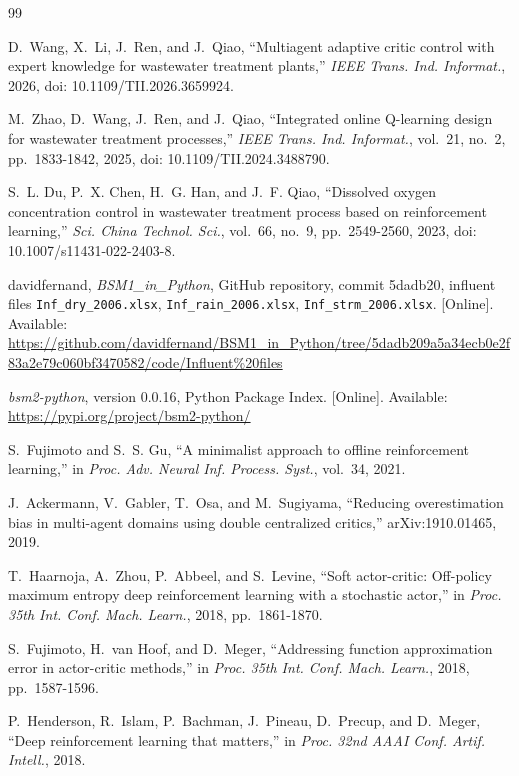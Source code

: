 \documentclass[journal]{IEEEtran}
\begin{document}
\begin{thebibliography}{99}

D.~Wang, X.~Li, J.~Ren, and J.~Qiao, ``Multiagent adaptive critic control with
expert knowledge for wastewater treatment plants,'' \emph{IEEE Trans. Ind.
Informat.}, 2026, doi: 10.1109/TII.2026.3659924.

M.~Zhao, D.~Wang, J.~Ren, and J.~Qiao, ``Integrated online Q-learning design
for wastewater treatment processes,'' \emph{IEEE Trans. Ind. Informat.},
vol.~21, no.~2, pp.~1833-1842, 2025, doi: 10.1109/TII.2024.3488790.

S.~L. Du, P.~X. Chen, H.~G. Han, and J.~F. Qiao, ``Dissolved oxygen
concentration control in wastewater treatment process based on reinforcement
learning,'' \emph{Sci. China Technol. Sci.}, vol.~66, no.~9,
pp.~2549-2560, 2023, doi: 10.1007/s11431-022-2403-8.

davidfernand, \emph{BSM1\_in\_Python}, GitHub repository,
commit 5dadb20, influent files \texttt{Inf\_dry\_2006.xlsx},
\texttt{Inf\_rain\_2006.xlsx}, \texttt{Inf\_strm\_2006.xlsx}. [Online].
Available:
\url{https://github.com/davidfernand/BSM1_in_Python/tree/5dadb209a5a34ecb0e2f83a2e79c060bf3470582/code/Influent%20files}

\emph{bsm2-python}, version 0.0.16, Python Package Index. [Online].
Available: \url{https://pypi.org/project/bsm2-python/}

S.~Fujimoto and S.~S. Gu, ``A minimalist approach to offline reinforcement
learning,'' in \emph{Proc. Adv. Neural Inf. Process. Syst.}, vol.~34, 2021.

J.~Ackermann, V.~Gabler, T.~Osa, and M.~Sugiyama, ``Reducing overestimation
bias in multi-agent domains using double centralized critics,''
arXiv:1910.01465, 2019.

T.~Haarnoja, A.~Zhou, P.~Abbeel, and S.~Levine, ``Soft actor-critic:
Off-policy maximum entropy deep reinforcement learning with a stochastic
actor,'' in \emph{Proc. 35th Int. Conf. Mach. Learn.}, 2018, pp.~1861-1870.

S.~Fujimoto, H.~van Hoof, and D.~Meger, ``Addressing function approximation
error in actor-critic methods,'' in \emph{Proc. 35th Int. Conf. Mach.
Learn.}, 2018, pp.~1587-1596.

P.~Henderson, R.~Islam, P.~Bachman, J.~Pineau, D.~Precup, and D.~Meger,
``Deep reinforcement learning that matters,'' in \emph{Proc. 32nd AAAI Conf.
Artif. Intell.}, 2018.


\end{thebibliography}
\end{document}
